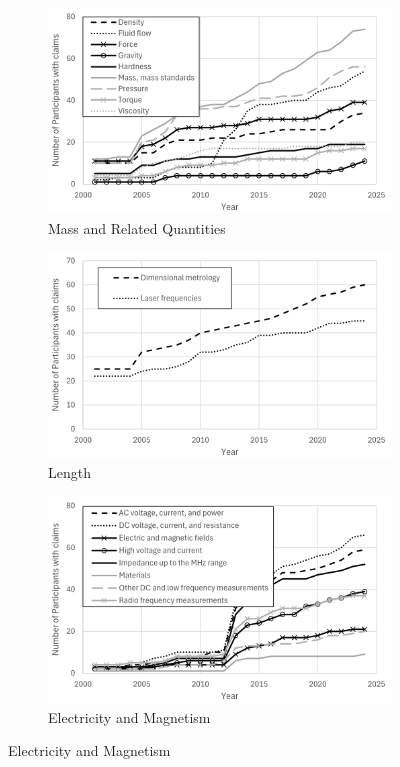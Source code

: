 \documentclass[
	a4paper, %
	10pt, %
	unnumberedsections, %
	twoside, %
]{LTJournalArticle}
\begin{document}
\begin{figure}[!t]
\centering
\begin{subfigure}[b]{0.48\textwidth}
    \includegraphics[width=\textwidth]{figures/Participants_Mass.png}
    \caption{Mass and Related Quantities}
    \label{fig:m_vs_time}
\end{subfigure}
\hfill
\begin{subfigure}[b]{0.48\textwidth}
    \includegraphics[width=\textwidth]{figures/Participants_Length.png}
    \caption{Length}
    \label{fig:l_vs_time}
\end{subfigure}
\hfill
\begin{subfigure}[b]{0.48\textwidth}
    \includegraphics[width=\textwidth]{figures/Participants_Electrical.png}
    \caption{Electricity and Magnetism}
    \label{fig:em_vs_time}
\end{subfigure}


\end{figure}
\end{document}
